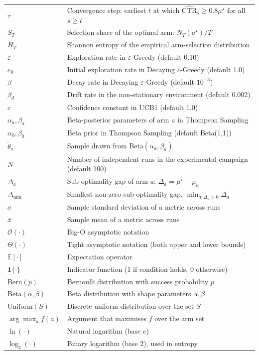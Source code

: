 \begin{xltabular}{\linewidth}{@{}p{3.0cm} X@{}}
$\tau$              & Convergence step: earliest $t$ at which $\widehat{\text{CTR}}_s \ge 0.8 \mu^\star$ for all $s \ge t$\\
$S_T$               & Selection share of the optimal arm: $N_T(a^\star)/T$\\
$H_T$               & Shannon entropy of the empirical arm-selection distribution\\
$\varepsilon$       & Exploration rate in $\varepsilon$-Greedy (default 0.10)\\
$\varepsilon_0$     & Initial exploration rate in Decaying $\varepsilon$-Greedy (default 1.0)\\
$\beta$             & Decay rate in Decaying $\varepsilon$-Greedy (default $10^{-3}$)\\
$\beta_d$           & Drift rate in the non-stationary environment (default 0.002)\\
$c$                 & Confidence constant in UCB1 (default 1.0)\\
$\alpha_a, \beta_a$ & Beta-posterior parameters of arm $a$ in Thompson Sampling\\
$\alpha_0, \beta_0$ & Beta prior in Thompson Sampling (default Beta(1,1))\\
$\tilde{\theta}_a$  & Sample drawn from $\mathrm{Beta}(\alpha_a, \beta_a)$\\
$N$                 & Number of independent runs in the experimental campaign (default 100)\\
$\Delta_a$          & Sub-optimality gap of arm $a$: $\Delta_a = \mu^\star - \mu_a$\\
$\Delta_{\min}$     & Smallest non-zero sub-optimality gap, $\min_{a:\Delta_a>0}\Delta_a$\\
$\sigma$            & Sample standard deviation of a metric across runs\\
$\bar{x}$           & Sample mean of a metric across runs\\
$\mathcal{O}(\cdot)$ & Big-O asymptotic notation\\
$\Theta(\cdot)$     & Tight asymptotic notation (both upper and lower bounds)\\
$\mathbb{E}[\cdot]$  & Expectation operator\\
$\mathbf{1}\{\cdot\}$ & Indicator function (1 if condition holds, 0 otherwise)\\
$\mathrm{Bern}(p)$  & Bernoulli distribution with success probability $p$\\
$\mathrm{Beta}(\alpha,\beta)$ & Beta distribution with shape parameters $\alpha,\beta$\\
$\mathrm{Uniform}(S)$ & Discrete uniform distribution over the set $S$\\
$\arg\max_a f(a)$   & Argument that maximises $f$ over the arm set\\
$\ln(\cdot)$        & Natural logarithm (base $e$)\\
$\log_2(\cdot)$     & Binary logarithm (base 2), used in entropy\\
\end{xltabular}

